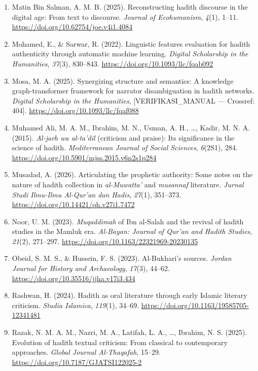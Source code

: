 \begin{enumerate}[leftmargin=1.5cm,itemindent=-1.5cm,label={},itemsep=4pt,parsep=2pt]
    \item Matin Bin Salman, A. M. B. (2025). Reconstructing hadith discourse in the digital age: From text to discourse. \textit{Journal of Ecohumanism}, \textit{4}(1), 1--11. \url{https://doi.org/10.62754/joe.v4i1.4084}
    \item Mohamed, E., \& Sarwar, R. (2022). Linguistic features evaluation for hadith authenticity through automatic machine learning. \textit{Digital Scholarship in the Humanities}, \textit{37}(3), 830--843. \url{https://doi.org/10.1093/llc/fqab092}
    \item Mosa, M. A. (2025). Synergizing structure and semantics: A knowledge graph-transformer framework for narrator disambiguation in hadith networks. \textit{Digital Scholarship in the Humanities}, [VERIFIKASI\_MANUAL --- Crossref: 404]. \url{https://doi.org/10.1093/llc/fqaf088}
    \item Muhamed Ali, M. A. M., Ibrahim, M. N., Usman, A. H., \ldots{}, Kadir, M. N. A. (2015). \textit{Al-jarh wa al-ta'dil} (criticism and praise): Its significance in the science of hadith. \textit{Mediterranean Journal of Social Sciences}, \textit{6}(2S1), 284. \url{https://doi.org/10.5901/mjss.2015.v6n2s1p284}
    \item Musadad, A. (2026). Articulating the prophetic authority: Some notes on the nature of hadith collection in \textit{al-Muwatta'} and \textit{musannaf} literature. \textit{Jurnal Studi Ilmu-Ilmu Al-Qur'an dan Hadis}, \textit{27}(1), 351--373. \url{https://doi.org/10.14421/qh.v27i1.7472}
    \item Noor, U. M. (2023). \textit{Muqaddimah} of Ibn al-Salah and the revival of hadith studies in the Mamluk era. \textit{Al-Bayan: Journal of Qur'an and Hadith Studies}, \textit{21}(2), 271--297. \url{https://doi.org/10.1163/22321969-20230135}
    \item Obeid, S. M. S., \& Hussein, F. S. (2023). Al-Bukhari's sources. \textit{Jordan Journal for History and Archaeology}, \textit{17}(3), 44--62. \url{https://doi.org/10.35516/jjha.v17i3.434}
    \item Rashwan, H. (2024). Hadith as oral literature through early Islamic literary criticism. \textit{Studia Islamica}, \textit{119}(1), 34--69. \url{https://doi.org/10.1163/19585705-12341481}
    \item Razak, N. M. A. M., Nazri, M. A., Latifah, L. A., \ldots{}, Ibrahim, N. S. (2025). Evolution of hadith textual criticism: From classical to contemporary approaches. \textit{Global Journal Al-Thaqafah}, 15--29. \url{https://doi.org/10.7187/GJATSI122025-2}

\end{enumerate}
